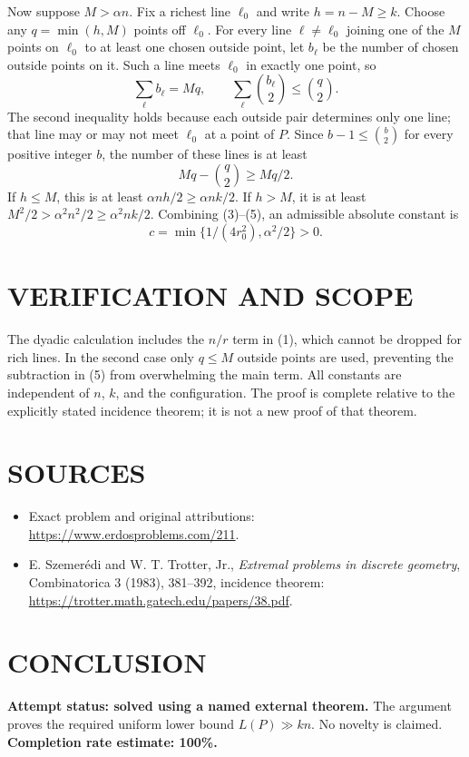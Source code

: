 Now suppose $M>\alpha n$. Fix a richest line $\ell_0$ and write $h=n-M\geq k$. Choose any $q=\min(h,M)$ points off $\ell_0$. For every line $\ell\ne\ell_0$ joining one of the $M$ points on $\ell_0$ to at least one chosen outside point, let $b_\ell$ be the number of chosen outside points on it. Such a line meets $\ell_0$ in exactly one point, so
\[
\sum_\ell b_\ell=Mq,\qquad
\sum_\ell\binom{b_\ell}{2}\leq\binom q2.
\tag{4}
\]
The second inequality holds because each outside pair determines only one line; that line may or may not meet $\ell_0$ at a point of $P$. Since $b-1\leq\binom b2$ for every positive integer $b$, the number of these lines is at least
\[
Mq-\binom q2\geq Mq/2.
\tag{5}
\]
If $h\leq M$, this is at least $\alpha nh/2\geq\alpha nk/2$. If $h>M$, it is at least $M^2/2>\alpha^2n^2/2\geq\alpha^2nk/2$. Combining (3)--(5), an admissible absolute constant is
\[
c=\min\{1/(4r_0^2),\alpha^2/2\}>0.
\]

\section{VERIFICATION AND SCOPE}
The dyadic calculation includes the $n/r$ term in (1), which cannot be dropped for rich lines. In the second case only $q\leq M$ outside points are used, preventing the subtraction in (5) from overwhelming the main term. All constants are independent of $n$, $k$, and the configuration. The proof is complete relative to the explicitly stated incidence theorem; it is not a new proof of that theorem.

\section{SOURCES}
\begin{itemize}
\item Exact problem and original attributions: \url{https://www.erdosproblems.com/211}.
\item E. Szemer\'edi and W. T. Trotter, Jr., \emph{Extremal problems in discrete geometry}, Combinatorica 3 (1983), 381--392, incidence theorem: \url{https://trotter.math.gatech.edu/papers/38.pdf}.
\end{itemize}
\section{CONCLUSION}
\textbf{Attempt status: solved using a named external theorem.} The argument proves the required uniform lower bound $L(P)\gg kn$. No novelty is claimed.
\textbf{Completion rate estimate: 100\%.}
